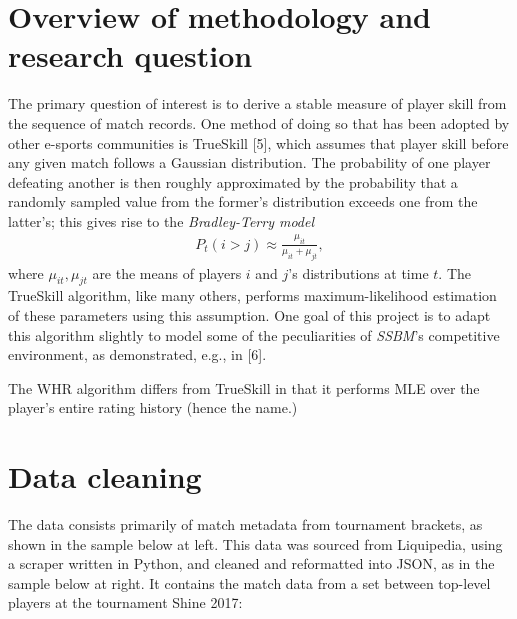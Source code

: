 \documentclass[10pt]{article}
\theoremstyle{definition}
\theoremstyle{remark}
\begin{document}
\section{Overview of methodology and research question}
The primary question of interest is to derive a stable measure of player
skill from the sequence of match records. One method of doing so that
has been adopted by other e-sports communities is TrueSkill {[}5{]},
which assumes that player skill before any given match follows a
Gaussian distribution. The probability of one player defeating another
is then roughly approximated by the probability that a randomly sampled
value from the former's distribution exceeds one from the latter's; this
gives rise to the \emph{Bradley-Terry model}
\begin{align*}
    P_t(i > j) \approx \frac{\mu_{it}}{\mu_{it} + \mu_{jt}},
\end{align*}
where $\mu_{it}, \mu_{jt}$ are the means of players $i$ and $j$'s
distributions at time $t$. The TrueSkill algorithm, like many others,
performs maximum-likelihood estimation of these parameters using this
assumption. One goal of this project is to adapt this algorithm slightly
to model some of the peculiarities of \emph{SSBM}'s competitive
environment, as demonstrated, e.g., in {[}6{]}.

The WHR algorithm differs from TrueSkill in that it performs MLE over the
player's entire rating history (hence the name.) 

\hypertarget{basic-data-model-and-project-workflow}{%
\section{Data cleaning}\label{basic-data-model-and-project-workflow}}

The data consists primarily of match metadata from tournament brackets,
as shown in the sample below at left. This data was sourced from Liquipedia,
using a scraper written in Python, and cleaned and reformatted into JSON, as
in the sample below at right. It contains the match data from a set between
top-level players at the tournament Shine 2017:
\end{document}
